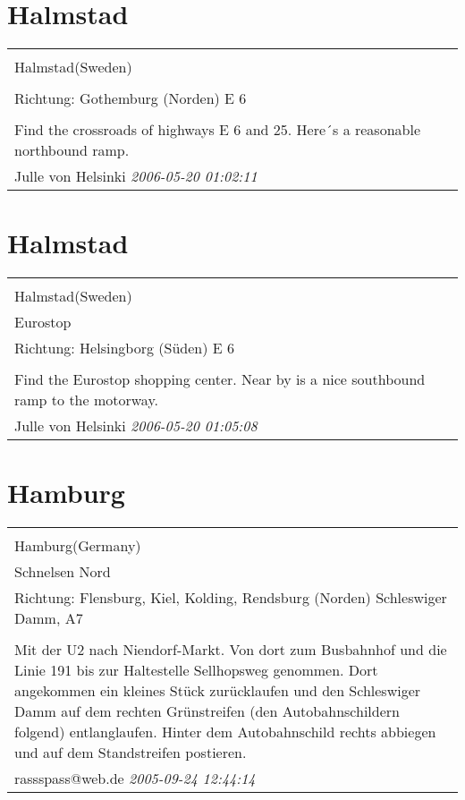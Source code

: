 \documentclass[a4paper,12pt]{article}
\begin{document}
\section{Halmstad}
\begin{tabular}{|p{13cm}|}
\hline\\
Halmstad(Sweden)\\
\\
Richtung: Gothemburg (Norden) E 6 \\
\hline\\
Find the crossroads of highways E 6 and 25. Here´s a reasonable northbound ramp. \\
Julle von Helsinki \textit{ 2006-05-20 01:02:11 }\\\hline
\end{tabular}


\section{Halmstad}
\begin{tabular}{|p{13cm}|}
\hline\\
Halmstad(Sweden)\\
Eurostop\\
Richtung: Helsingborg (Süden) E 6 \\
\hline\\
Find the Eurostop shopping center. Near by is a nice southbound ramp to the motorway. \\
Julle von Helsinki \textit{ 2006-05-20 01:05:08 }\\\hline
\end{tabular}


\section{Hamburg}
\begin{tabular}{|p{13cm}|}
\hline\\
Hamburg(Germany)\\
Schnelsen Nord\\
Richtung: Flensburg, Kiel, Kolding, Rendsburg (Norden) Schleswiger Damm, A7 \\
\hline\\
Mit der U2 nach Niendorf-Markt. Von dort zum Busbahnhof und die Linie 191 bis zur Haltestelle Sellhopsweg genommen. Dort angekommen ein kleines Stück zurücklaufen und den Schleswiger Damm auf dem rechten Grünstreifen (den Autobahnschildern folgend) entlanglaufen. Hinter dem Autobahnschild rechts abbiegen und auf dem Standstreifen postieren. \\
rassspass@web.de \textit{ 2005-09-24 12:44:14 }\\\hline
\end{tabular}
\end{document}
